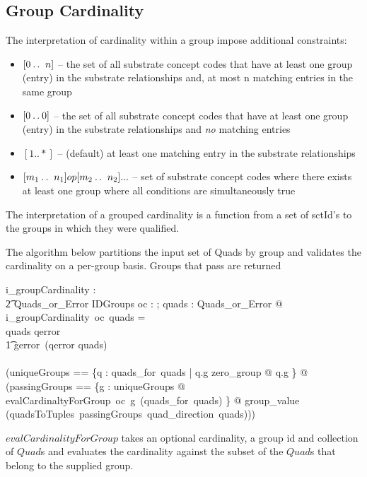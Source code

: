 \documentclass{article}
\begin{document}
 

\subsection{Group Cardinality}
The interpretation of cardinality within a group impose additional constraints:
\begin{itemize}[noitemsep,nolistsep]
\item{$[0\mathbin{\ldotp\ldotp}~n]$} -- the set of all substrate concept codes that have at least one group (entry) in the substrate relationships and,
at most n matching entries in the same group
\item{$[0\mathbin{\ldotp\ldotp}0]$} -- the set of all substrate concept codes that have at least one group (entry) in the substrate relationships and \emph{no} matching entries 
\item{$[1..*]$} -- (default) at least one matching entry in the substrate relationships
\item{$[m_1\mathbin{\ldotp\ldotp}~n_1] op [m_2\mathbin{\ldotp\ldotp}~n_2] ... $} -- set of substrate concept codes where there exists at least one group where all conditions are simultaneously true
\end{itemize}

The interpretation of a grouped cardinality is a function from a set of sctId's to the groups in which they were qualified.

The algorithm below partitions the input set of Quads by group and validates the cardinality on a per-group basis.  Groups that
pass are returned

\begin{gendef}
   i\_groupCardinality : \\
\t2 \optional[cardinality] \fun Quads\_or\_Error \fun  IDGroups
\where
   \forall oc : \optional[cardinality]; quads : Quads\_or\_Error @ \\
   i\_groupCardinality~oc~quads = \\
   \IF quads \in \ran qerror \\
\t1 \THEN gerror~(qerror \inv quads) \\
   \ELSE \\
   (\LET uniqueGroups == \{q : quads\_for~quads | q.g \neq zero\_group @ q.g \} @ \\
   (\LET passingGroups == \bigcup \{g : uniqueGroups @ evalCardinaltyForGroup~oc~g~(quads\_for~quads) \} @
   group\_value (quadsToTuples~passingGroups~quad\_direction~quads)))
\end{gendef}

$evalCardinalityForGroup$ takes an optional cardinality, a group id and collection of $Quad$s and evaluates the cardinality against the subset of
the $Quad$s that belong to the supplied group.
\end{document}
